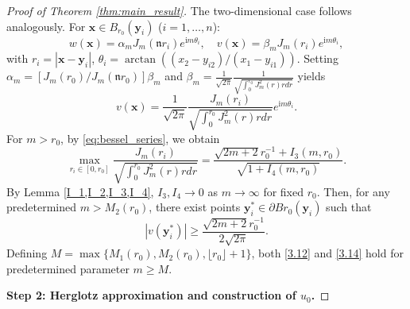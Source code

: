 \documentclass[11pt,reqno,oneside]{amsart}
\numberwithin{equation}{section}
\theoremstyle{definition}
\theoremstyle{remark}
\numberwithin{equation}{section}
\begin{document}
\begin{proof}[Proof of Theorem \ref{thm:main_result}]
		\medskip
		\item[\textbf{Case 2}: $d=2.$] The two-dimensional case follows analogously. For $\mathbf{x} \in B_{r_0}(\mathbf{y}_i)$ ($i=1,\dots,n$):
		\begin{equation*}
			w(\mathbf{x}) = \alpha_m J_m( \mathfrak{n} r_i) e^{\mathrm{i}m \theta_i}, \quad
			v(\mathbf{x}) = \beta_m J_m( r_i) e^{\mathrm{i}m \theta_i},
		\end{equation*}
		with $r_i = |\mathbf{x}-\mathbf{y}_i|$, $\theta_i = \arctan((x_2-y_{i2})/(x_1-y_{i1}))$. Setting $\alpha_m = [J_m( r_0)/J_m( \mathfrak{n} r_0)] \beta_m$ and $	\beta _m=\frac{1}{\sqrt{2\pi}}\frac{1}{\sqrt{ \int_{0}^{ r_0}J^2_m(r)rdr}}$  yields 
		\begin{equation}\label{d=2}
			v(\mathbf{x}) = \frac{1}{\sqrt{2\pi}} \frac{ J_m( r_i)}{\sqrt{\int_{0}^{ r_0} J_{m}^2(r) r  dr}} e^{\mathrm{i}m \theta_i}.
		\end{equation}
		For $m > r_0$, by \eqref{eq:bessel_series}, we obtain
		\begin{equation}\label{max d=2}
			\max_{r_i \in [0,r_0]} \frac{ J_m(r_i)}{\sqrt{\int_{0}^{ r_0} J_{m}^2(r) r  dr}} = \frac{\sqrt{2m+2} r^{-1}_0 + I_3(m,r_0)}{\sqrt{1 + I_4(m,r_0)}}.
		\end{equation}
		By Lemma \ref{I_1,I_2,I_3,I_4}, $I_3, I_4 \to 0$ as $m \to \infty$ for fixed $r_0$. Then, for any predetermined $m > M_2(r_0)$, there exist points $\mathbf{y}^{*}_{i} \in \partial B{r_0}(\mathbf{y}_i)$ such that
		\begin{equation}\label{3.14}
			|v(\mathbf{y}^*_i)| \geqslant \frac{\sqrt{2m+2} r^{-1}_0}{2\sqrt{2\pi}}.
		\end{equation}
		Defining $M = \max\{M_1(r_0), M_2(r_0), \lfloor r_0 \rfloor + 1\}$, both \eqref{3.12} and \eqref{3.14} hold for predetermined parameter $m \geqslant M$.
		
		
		\medskip
		\textbf{Step 2: Herglotz approximation and construction of $u_0$.}
		

\end{proof}
\end{document}
